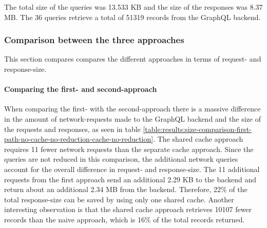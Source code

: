 

\fi

The total size of the queries was 13.533 KB and the size of the responses was 8.37 MB. The 36 queries retrieve a total of 51319 records from the GraphQL backend.

\subsubsection{Comparison between the three approaches}

This section compares compares the different approaches in terms of request- and response-size.

\paragraph{Comparing the first- and second-approach}

When comparing the first- with the second-approach there is a massive difference in the amount of network-requests made to the GraphQL backend and the size of the requests and responses, as seen in table \ref{table:results:size-comparison-first-path-no-cache-no-reduction-cache-no-reduction}. The shared cache approach requires 11 fewer network requests than the separate cache approach. Since the queries are not reduced in this comparison, the additional network queries account for the overall difference in request- and response-size. The 11 additional requests from the first approach send an additional 2.29 KB to the backend and return about an additional 2.34 MB from the backend. Therefore, 22\% of the total response-size can be saved by using only one shared cache. Another interesting observation is that the shared cache approach retrieves 10107 fewer records than the naive approach, which is 16\% of the total records returned.

